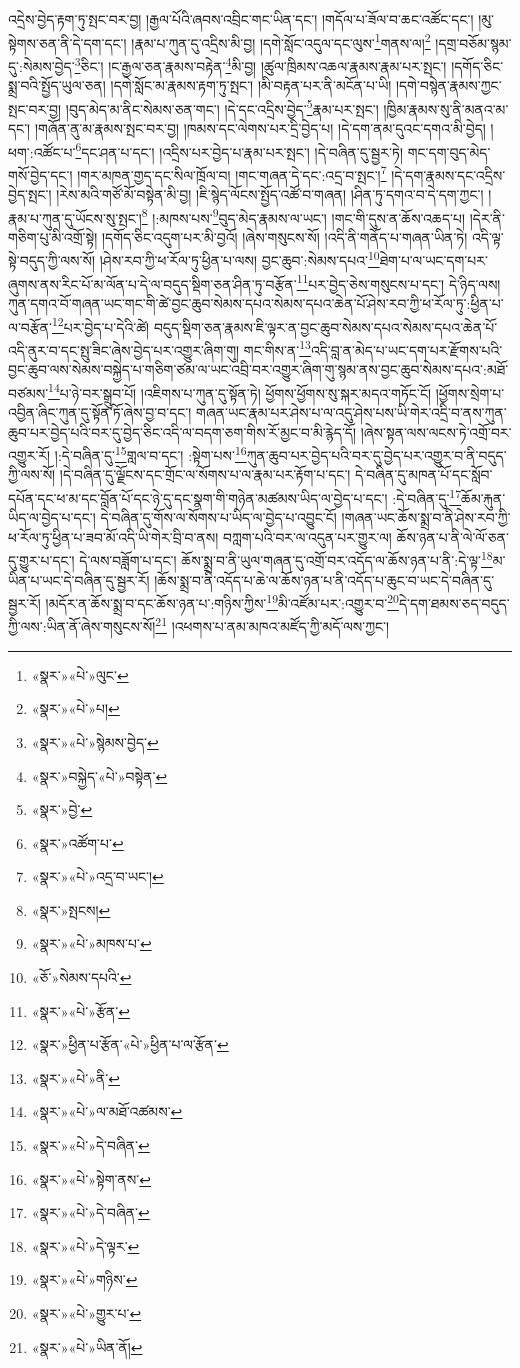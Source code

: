འདྲེས་བྱེད་རྟག་ཏུ་སྤང་བར་བྱ། །རྒྱལ་པོའི་ཞབས་འབྲིང་གང་ཡིན་དང་། །གདོལ་པ་ཟོལ་བ་ཆང་འཚོང་དང་། །མུ་སྟེགས་ཅན་ནི་དེ་དག་དང་། །རྣམ་པ་ཀུན་དུ་འདྲིས་མི་བྱ། །དགེ་སློང་འདུལ་དང་ལུས་\footnote{«སྣར་»«པེ་»ལུང་}གནས་ལ།\footnote{«སྣར་»«པེ་»པ།} །དགྲ་བཅོམ་སྙམ་དུ་:སེམས་བྱེད་\footnote{«སྣར་»«པེ་»སྙེམས་བྱེད་}ཅིང་། །ང་རྒྱལ་ཅན་རྣམས་བརྟེན་\footnote{«སྣར་»བསྐྱེད་«པེ་»བསྟེན་}མི་བྱ། །ཚུལ་ཁྲིམས་འཆལ་རྣམས་རྣམ་པར་སྤང་། །དགོད་ཅིང་སྨྲ་བའི་སྤྱོད་ཡུལ་ཅན། །དགེ་སློང་མ་རྣམས་རྟག་ཏུ་སྤང་། །མི་བརྟན་པར་ནི་མངོན་པ་ཡི། །དགེ་བསྙེན་རྣམས་ཀྱང་སྤང་བར་བྱ། །བུད་མེད་མ་ནིང་སེམས་ཅན་གང་། །དེ་དང་འདྲིས་བྱེད་\footnote{«སྣར་»བྱེ་}རྣམ་པར་སྤང་། །ཁྱིམ་རྣམས་སུ་ནི་མནའ་མ་དང་། །གཞོན་ནུ་མ་རྣམས་སྤང་བར་བྱ། །ཁམས་དང་ལེགས་པར་དྲི་བྱེད་པ། །དེ་དག་ནམ་དུའང་དགའ་མི་བྱེད། །ཕག་:འཚོང་པ་\footnote{«སྣར་»འཚོག་པ་}དང་ཤན་པ་དང་། །འདྲིས་པར་བྱེད་པ་རྣམ་པར་སྤང་། །དེ་བཞིན་དུ་སྦྱར་ཏེ། གང་དག་བུད་མེད་གསོ་བྱེད་དང་། །གར་མཁན་གྱད་དང་སིལ་ཁྲོལ་བ། །གང་གཞན་དེ་དང་:འདྲ་བ་སྤང་།\footnote{«སྣར་»«པེ་»འདྲ་བ་ཡང་།} །དེ་དག་རྣམས་དང་འདྲིས་བྱེད་སྤང་། །རེས་མའི་གཙོ་མོ་བསྟེན་མི་བྱ། །ཇི་སྙེད་ལོངས་སྤྱོད་འཚོ་བ་གཞན། །ཤིན་ཏུ་དགའ་བ་དེ་དག་ཀྱང་། །རྣམ་པ་ཀུན་དུ་ཡོངས་སུ་སྤང་།\footnote{«སྣར་»སྤངས།} །:མཁས་པས་\footnote{«སྣར་»«པེ་»མཁས་པ་}བུད་མེད་རྣམས་ལ་ཡང་། །གང་གི་དུས་ན་ཆོས་འཆད་པ། །དེར་ནི་གཅིག་པུ་མི་འགྲོ་སྟེ། །དགོད་ཅིང་འདུག་པར་མི་བྱའོ། །ཞེས་གསུངས་སོ། །འདི་ནི་གནོད་པ་གཞན་ཡིན་ཏེ། འདི་ལྟ་སྟེ་བདུད་ཀྱི་ལས་སོ། །ཤེས་རབ་ཀྱི་ཕ་རོལ་ཏུ་ཕྱིན་པ་ལས། བྱང་ཆུབ་:སེམས་དཔའ་\footnote{«ཅོ་»སེམས་དཔའི་}ཐེག་པ་ལ་ཡང་དག་པར་ཞུགས་ནས་རིང་པོ་མ་ལོན་པ་དེ་ལ་བདུད་སྡིག་ཅན་ཤིན་ཏུ་བརྩོན་\footnote{«སྣར་»«པེ་»རྩོན་}པར་བྱེད་ཅེས་གསུངས་པ་དང་། དེ་ཉིད་ལས། ཀུན་དགའ་བོ་གཞན་ཡང་གང་གི་ཚེ་བྱང་ཆུབ་སེམས་དཔའ་སེམས་དཔའ་ཆེན་པོ་ཤེས་རབ་ཀྱི་ཕ་རོལ་ཏུ་:ཕྱིན་པ་ལ་བརྩོན་\footnote{«སྣར་»ཕྱིན་པ་རྩོན་«པེ་»ཕྱིན་པ་ལ་རྩོན་}པར་བྱེད་པ་དེའི་ཚེ། བདུད་སྡིག་ཅན་རྣམས་ཇི་ལྟར་ན་བྱང་ཆུབ་སེམས་དཔའ་སེམས་དཔའ་ཆེན་པོ་འདི་ནུར་བ་དང་སྤུ་ཟིང་ཞེས་བྱེད་པར་འགྱུར་ཞིག་གུ། གང་གིས་ན་\footnote{«སྣར་»«པེ་»ནི་}འདི་བླ་ན་མེད་པ་ཡང་དག་པར་རྫོགས་པའི་བྱང་ཆུབ་ལས་སེམས་བསྐྱེད་པ་གཅིག་ཙམ་ལ་ཡང་འབྲི་བར་འགྱུར་ཞིག་གུ་སྙམ་ནས་བྱང་ཆུབ་སེམས་དཔའ་:མཐོ་བཙམས་\footnote{«སྣར་»«པེ་»ལ་མཐོ་འཚམས་}པ་ཉེ་བར་སྒྲུབ་པོ། །འཇིགས་པ་ཀུན་དུ་སྟོན་ཏེ། ཕྱོགས་ཕྱོགས་སུ་སྐར་མདའ་གཏོང་ངོ། །ཕྱོགས་སྲེག་པ་འབྱིན་ཞིང་ཀུན་དུ་སྟོན་ཏོ་ཞེས་བྱ་བ་དང་། གཞན་ཡང་རྣམ་པར་ཤེས་པ་ལ་འདུ་ཤེས་པས་ཡི་གེར་འདྲི་བ་ནས་ཀུན་ཆུབ་པར་བྱེད་པའི་བར་དུ་བྱེད་ཅིང་འདི་ལ་བདག་ཅག་གིས་རོ་མྱང་བ་མི་རྙེད་དོ། །ཞེས་སྟན་ལས་ལངས་ཏེ་འགྲོ་བར་འགྱུར་རོ། །:དེ་བཞིན་དུ་\footnote{«སྣར་»«པེ་»དེ་བཞིན་}གླལ་བ་དང་། :སྟེག་པས་\footnote{«སྣར་»«པེ་»སྟེག་ནས་}ཀུན་ཆུབ་པར་བྱེད་པའི་བར་དུ་བྱེད་པར་འགྱུར་བ་ནི་བདུད་ཀྱི་ལས་སོ། །དེ་བཞིན་དུ་ལྗོངས་དང་གྲོང་ལ་སོགས་པ་ལ་རྣམ་པར་རྟོག་པ་དང་། དེ་བཞིན་དུ་མཁན་པོ་དང་སློབ་དཔོན་དང་ཕ་མ་དང་བློན་པོ་དང་ཉེ་དུ་དང་སྣག་གི་གཉེན་མཚམས་ཡིད་ལ་བྱེད་པ་དང་། :དེ་བཞིན་དུ་\footnote{«སྣར་»«པེ་»དེ་བཞིན་}ཆོམ་རྐུན་ཡིད་ལ་བྱེད་པ་དང་། དེ་བཞིན་དུ་གོས་ལ་སོགས་པ་ཡིད་ལ་བྱེད་པ་འབྱུང་ངོ། །གཞན་ཡང་ཆོས་སྨྲ་བ་ནི་ཤེས་རབ་ཀྱི་ཕ་རོལ་ཏུ་ཕྱིན་པ་ཟབ་མོ་འདི་ཡི་གེར་བྲི་བ་ནས། བཀླག་པའི་བར་ལ་འདུན་པར་གྱུར་ལ། ཆོས་ཉན་པ་ནི་ལེ་ལོ་ཅན་དུ་གྱུར་པ་དང་། དེ་ལས་བཟློག་པ་དང་། ཆོས་སྨྲ་བ་ནི་ཡུལ་གཞན་དུ་འགྲོ་བར་འདོད་ལ་ཆོས་ཉན་པ་ནི་:དེ་ལྟ་\footnote{«སྣར་»«པེ་»དེ་ལྟར་}མ་ཡིན་པ་ཡང་དེ་བཞིན་དུ་སྦྱར་རོ། །ཆོས་སྨྲ་བ་ནི་འདོད་པ་ཆེ་ལ་ཆོས་ཉན་པ་ནི་འདོད་པ་ཆུང་བ་ཡང་དེ་བཞིན་དུ་སྦྱར་རོ། །མདོར་ན་ཆོས་སྨྲ་བ་དང་ཆོས་ཉན་པ་:གཉིས་ཀྱིས་\footnote{«སྣར་»«པེ་»གཉིས་}མི་འཛོམ་པར་:འགྱུར་བ་\footnote{«སྣར་»«པེ་»གྱུར་པ་}དེ་དག་ཐམས་ཅད་བདུད་ཀྱི་ལས་:ཡིན་ནོ་ཞེས་གསུངས་སོ།\footnote{«སྣར་»«པེ་»ཡིན་ནོ།} །འཕགས་པ་ནམ་མཁའ་མཛོད་ཀྱི་མདོ་ལས་ཀྱང་། 